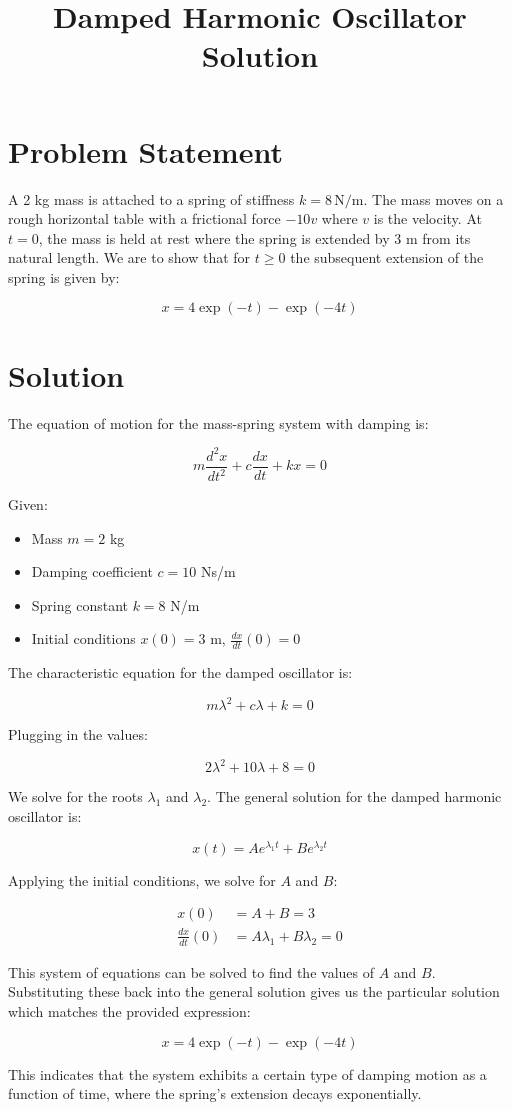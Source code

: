 \documentclass{article}
\begin{document}
\title{Damped Harmonic Oscillator Solution}
\date{}
\maketitle

\section*{Problem Statement}
A 2 kg mass is attached to a spring of stiffness \( k = 8 \, \text{N/m} \). The mass moves on a rough horizontal table with a frictional force \( -10v \) where \( v \) is the velocity. At \( t = 0 \), the mass is held at rest where the spring is extended by 3 m from its natural length. We are to show that for \( t \geq 0 \) the subsequent extension of the spring is given by:

\[ x = 4\exp(-t) - \exp(-4t) \]

\section*{Solution}
The equation of motion for the mass-spring system with damping is:

\[ m\frac{d^2x}{dt^2} + c\frac{dx}{dt} + kx = 0 \]

Given:
\begin{itemize}
    \item Mass \( m = 2 \) kg
    \item Damping coefficient \( c = 10 \) Ns/m
    \item Spring constant \( k = 8 \) N/m
    \item Initial conditions \( x(0) = 3 \) m, \( \frac{dx}{dt}(0) = 0 \)
\end{itemize}

The characteristic equation for the damped oscillator is:

\[ m\lambda^2 + c\lambda + k = 0 \]

Plugging in the values:

\[ 2\lambda^2 + 10\lambda + 8 = 0 \]

We solve for the roots \( \lambda_1 \) and \( \lambda_2 \). The general solution for the damped harmonic oscillator is:

\[ x(t) = Ae^{\lambda_1 t} + Be^{\lambda_2 t} \]

Applying the initial conditions, we solve for \( A \) and \( B \):

\begin{align*}
    x(0) &= A + B = 3 \\
    \frac{dx}{dt}(0) &= A\lambda_1 + B\lambda_2 = 0
\end{align*}

This system of equations can be solved to find the values of \( A \) and \( B \). Substituting these back into the general solution gives us the particular solution which matches the provided expression:

\[ x = 4\exp(-t) - \exp(-4t) \]

This indicates that the system exhibits a certain type of damping motion as a function of time, where the spring's extension decays exponentially.
\end{document}
